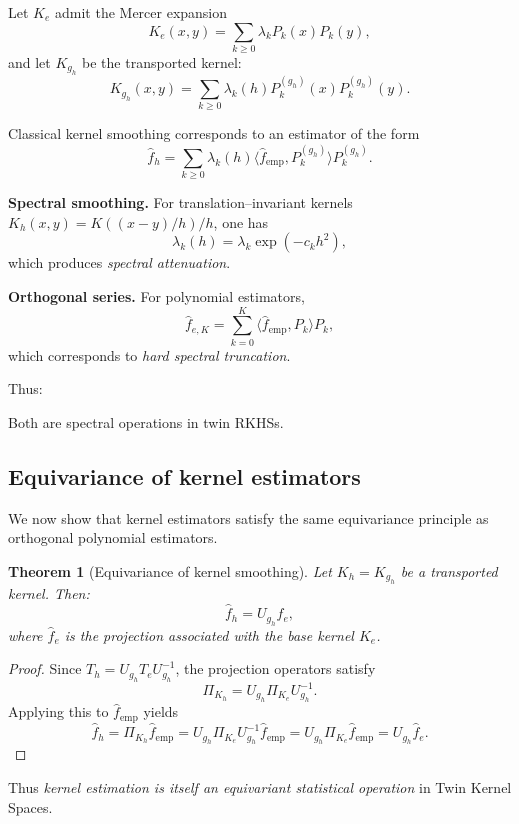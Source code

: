 \documentclass[11pt,a4paper]{article}
\newtheorem{theorem}{Theorem}[section]
\newcommand{\ip}[2]{\langle #1, #2 \rangle}
\begin{document}
Let $K_e$ admit the Mercer expansion
\[
K_e(x, y) = \sum_{k \geq 0} \lambda_k P_k(x) P_k(y),
\]
and let $K_{g_h}$ be the transported kernel:
\[
K_{g_h}(x, y) = \sum_{k \geq 0} \lambda_k(h) P_k^{(g_h)}(x) P_k^{(g_h)}(y).
\]

Classical kernel smoothing corresponds to an estimator of the form
\[
\hat{f}_h = \sum_{k \geq 0} \lambda_k(h) \ip{\hat{f}_{\mathrm{emp}}}{P_k^{(g_h)}} P_k^{(g_h)}.
\]

\textbf{Spectral smoothing.} For translation--invariant kernels $K_h(x, y) = K((x-y)/h)/h$, one has
\[
\lambda_k(h) = \lambda_k \exp(-c_k h^2),
\]
which produces \emph{spectral attenuation}.

\textbf{Orthogonal series.} For polynomial estimators,
\[
\hat{f}_{e,K} = \sum_{k=0}^{K} \ip{\hat{f}_{\mathrm{emp}}}{P_k} P_k,
\]
which corresponds to \emph{hard spectral truncation}.

Thus:
\begin{center}
\end{center}

Both are spectral operations in twin RKHSs.

\subsection{Equivariance of kernel estimators}

We now show that kernel estimators satisfy the same equivariance principle as orthogonal polynomial estimators.

\begin{theorem}[Equivariance of kernel smoothing]\label{thm:equivariance_kernel}
Let $K_h = K_{g_h}$ be a transported kernel. Then:
\[
\hat{f}_h = U_{g_h} \hat{f}_e,
\]
where $\hat{f}_e$ is the projection associated with the base kernel $K_e$.
\end{theorem}

\begin{proof}
Since $T_h = U_{g_h} T_e U_{g_h}^{-1}$, the projection operators satisfy
\[
\Pi_{K_h} = U_{g_h} \Pi_{K_e} U_{g_h}^{-1}.
\]
Applying this to $\hat{f}_{\mathrm{emp}}$ yields
\[
\hat{f}_h = \Pi_{K_h} \hat{f}_{\mathrm{emp}} = U_{g_h} \Pi_{K_e} U_{g_h}^{-1} \hat{f}_{\mathrm{emp}} = U_{g_h} \Pi_{K_e} \hat{f}_{\mathrm{emp}} = U_{g_h} \hat{f}_e.
\]
\end{proof}

Thus \emph{kernel estimation is itself an equivariant statistical operation} in Twin Kernel Spaces.
\end{document}
